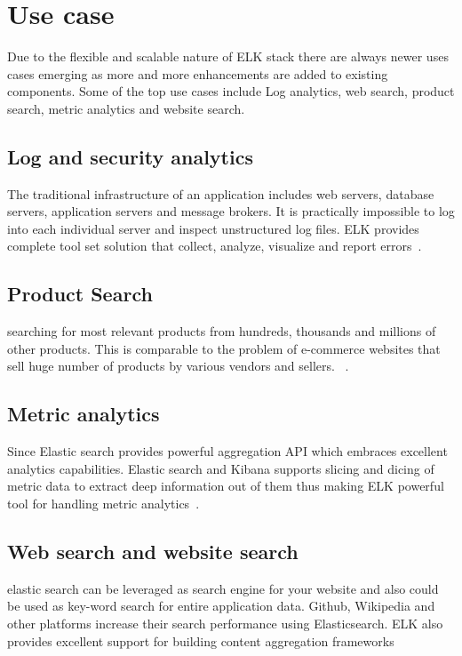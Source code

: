 \section{Use case}

Due to the flexible and scalable nature of ELK stack there are always 
newer uses cases emerging as more and more enhancements are added to existing 
components. Some of the top use cases include Log analytics, web search, 
product search, metric analytics and website search. 

\subsection{Log and security analytics}

The traditional infrastructure of an application includes web servers, database 
servers, application servers and message brokers. It is practically impossible 
to log into each individual server and inspect unstructured log files. ELK 
provides complete tool set solution that collect, analyze, visualize and report 
errors~\cite{hid-sp18-410-elk-usecase}.  

\subsection{Product Search}

searching for most relevant products from hundreds, thousands and millions of 
other products. This is comparable to the problem of e-commerce websites that 
sell huge number of products by various vendors and sellers.
~\cite{hid-sp18-410-elk-usecase}.

\subsection{Metric analytics}

Since Elastic search provides powerful aggregation API which embraces excellent 
analytics capabilities. Elastic search and Kibana supports slicing and dicing 
of metric data to extract deep information out of them thus making ELK powerful 
tool for handling metric analytics~\cite{hid-sp18-410-elk-usecase}. 


\subsection{Web search and website search}

elastic search can be leveraged as search engine for your website and also could
 be used as key-word search for entire application data. Github, Wikipedia and 
 other platforms increase their search performance using Elasticsearch. ELK also
  provides excellent support for building content aggregation frameworks
  ~\cite{hid-sp18-410-elk-usecase}  




